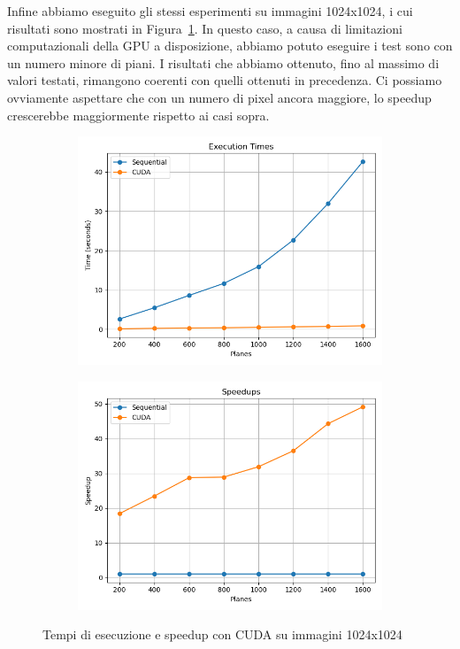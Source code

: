 Infine abbiamo eseguito gli stessi esperimenti su immagini 1024x1024, i cui risultati sono mostrati in Figura~\ref{fig:cuda_1024}.
In questo caso, a causa di limitazioni computazionali della GPU a disposizione, abbiamo potuto eseguire i test sono con un numero minore di piani.
I risultati che abbiamo ottenuto, fino al massimo di valori testati, rimangono coerenti con quelli ottenuti in precedenza.
Ci possiamo ovviamente aspettare che con un numero di pixel ancora maggiore, lo speedup crescerebbe maggiormente rispetto ai casi sopra.
\begin{figure}[H]
    \centering
    \begin{subfigure}{0.49\textwidth}
        \centering
        \includegraphics[width=\textwidth]{../results/plots/1024/cuda_times}
    \end{subfigure}
    \begin{subfigure}{0.49\textwidth}
        \centering
        \includegraphics[width=\textwidth]{../results/plots/1024/cuda_speedup}
    \end{subfigure}
    \caption{Tempi di esecuzione e speedup con CUDA su immagini 1024x1024}
    \label{fig:cuda_1024}
\end{figure}

